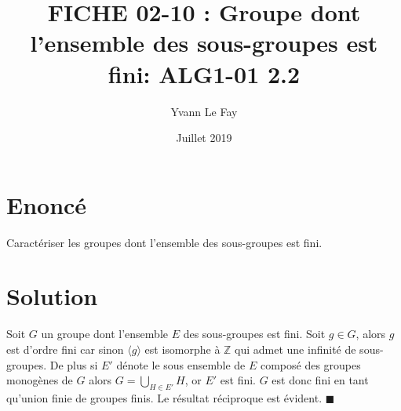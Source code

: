 \documentclass{article}
\newcommand*{\QED}{\hfill\ensuremath{\blacksquare}}%
\begin{document}
\title{FICHE 02-10 : Groupe dont l'ensemble des sous-groupes est fini: ALG1-01 2.2}
\author{Yvann Le Fay}
\date{Juillet 2019}
\maketitle
\section*{Enoncé}
Caractériser les groupes dont l'ensemble des sous-groupes est fini.
\section*{Solution}
Soit $G$ un groupe dont l'ensemble $E$ des sous-groupes est fini. Soit $g\in G$, alors $g$ est d'ordre fini car sinon $\langle g \rangle$ est isomorphe à $\mathbb{Z}$ qui admet une infinité de sous-groupes. De plus si $E'$ dénote le sous ensemble de $E$ composé des groupes monogènes de $G$ alors $G = \bigcup_{H\in E'} H$, or $E'$ est fini. $G$ est donc fini en tant qu'union finie de groupes finis. Le résultat réciproque est évident. 
\QED
\end{document}
